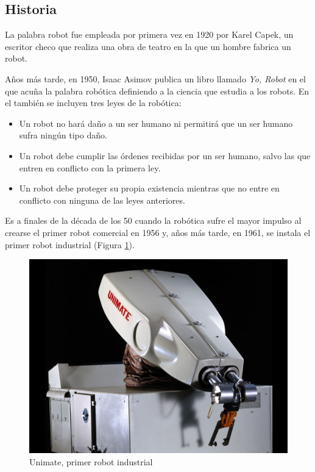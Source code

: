 \subsection{Historia}
La palabra robot fue empleada por primera vez en 1920 por Karel Capek, un escritor checo que realiza una obra de teatro en la que un hombre fabrica un robot. 

Años más tarde, en 1950, Isaac Asimov publica un libro llamado \textit{Yo, Robot} en el que acuña la palabra robótica definiendo a la ciencia que estudia a los robots. En el también se incluyen tres leyes de la robótica:
\begin{itemize}
    \item Un robot no hará daño a un ser humano ni permitirá que un ser humano sufra ningún tipo daño.
    \item Un robot debe cumplir las órdenes recibidas por un ser humano, salvo las que entren en conflicto con la primera ley.
    \item Un robot debe proteger su propia existencia mientras que no entre en conflicto con ninguna de las leyes anteriores. 
\end{itemize}{}

Es a finales de la década de los 50 cuando la robótica sufre el mayor impulso al crearse el primer robot comercial en 1956 y, años más tarde, en 1961, se instala el primer robot industrial (Figura \ref{fig:unimate}).  

\begin{figure}[H]
\centering
\includegraphics[scale=0.2]{img/unimate.jpg}
\caption{Unimate, primer robot industrial} \label{fig:unimate}
\end{figure}

